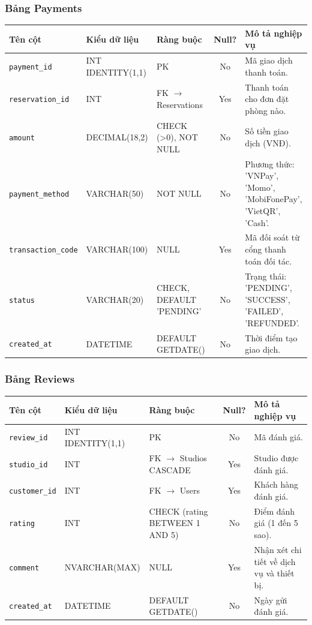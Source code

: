 \subsubsection{Bảng Payments}
\begin{table}[H]
\centering
\small
\begin{tabularx}{\textwidth}{l l l c X}
\toprule
\textbf{Tên cột} & \textbf{Kiểu dữ liệu} & \textbf{Ràng buộc} & \textbf{Null?} & \textbf{Mô tả nghiệp vụ} \\
\midrule
\texttt{payment\_id} & INT IDENTITY(1,1) & PK & No & Mã giao dịch thanh toán. \\
\texttt{reservation\_id}& INT & FK $\rightarrow$ Reservations & Yes & Thanh toán cho đơn đặt phòng nào. \\
\texttt{amount} & DECIMAL(18,2) & CHECK (>0), NOT NULL & No & Số tiền giao dịch (VNĐ). \\
\texttt{payment\_method}& VARCHAR(50) & NOT NULL & No & Phương thức: 'VNPay', 'Momo', 'MobiFonePay', 'VietQR', 'Cash'. \\
\texttt{transaction\_code}& VARCHAR(100)& NULL & Yes & Mã đối soát từ cổng thanh toán đối tác. \\
\texttt{status} & VARCHAR(20) & CHECK, DEFAULT 'PENDING' & No & Trạng thái: 'PENDING', 'SUCCESS', 'FAILED', 'REFUNDED'. \\
\texttt{created\_at} & DATETIME & DEFAULT GETDATE() & No & Thời điểm tạo giao dịch. \\
\bottomrule
\end{tabularx}
\end{table}

\subsubsection{Bảng Reviews}
\begin{table}[H]
\centering
\small
\begin{tabularx}{\textwidth}{l l l c X}
\toprule
\textbf{Tên cột} & \textbf{Kiểu dữ liệu} & \textbf{Ràng buộc} & \textbf{Null?} & \textbf{Mô tả nghiệp vụ} \\
\midrule
\texttt{review\_id} & INT IDENTITY(1,1) & PK & No & Mã đánh giá. \\
\texttt{studio\_id} & INT & FK $\rightarrow$ Studios CASCADE & Yes & Studio được đánh giá. \\
\texttt{customer\_id} & INT & FK $\rightarrow$ Users & Yes & Khách hàng đánh giá. \\
\texttt{rating} & INT & CHECK (rating BETWEEN 1 AND 5) & No & Điểm đánh giá (1 đến 5 sao). \\
\texttt{comment} & NVARCHAR(MAX) & NULL & Yes & Nhận xét chi tiết về dịch vụ và thiết bị. \\
\texttt{created\_at} & DATETIME & DEFAULT GETDATE() & No & Ngày gửi đánh giá. \\
\bottomrule
\end{tabularx}
\end{table}

